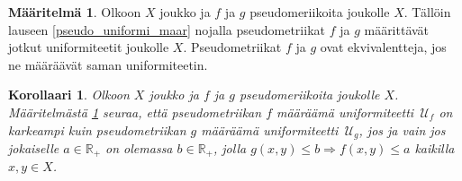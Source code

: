 \documentclass[12pt,a4paper,leqno]{report}
\newcommand{\R}{\mathbb{R}}
\newcommand{\U}{\,\mathcal{U}}
\theoremstyle{plain}
\newtheorem{kor}[equation]{Korollaari}
\theoremstyle{definition}
\newtheorem{maar}[equation]{Määritelmä}
\theoremstyle{remark}
\begin{document}
\begin{maar}\label{pseudo_equiv}
Olkoon $X$ joukko ja $f$ ja $g$ pseudomeriikoita joukolle $X$. 
Tällöin lauseen \ref{pseudo_uniformi_maar} nojalla 
pseudometriikat $f$ ja $g$ määrittävät jotkut uniformiteetit joukolle $X$.
Pseudometriikat $f$ ja $g$ ovat ekvivalentteja, jos ne määräävät saman uniformiteetin.
\end{maar}
\begin{kor}
Olkoon $X$ joukko ja $f$ ja $g$ pseudomeriikoita joukolle $X$. 
Määritelmästä \ref{pseudo_equiv} seuraa, että pseudometriikan $f$ määräämä uniformiteetti 
$\U_f$ 
on karkeampi kuin pseudometriikan $g$ määräämä uniformiteetti $\U_g$, jos ja vain jos jokaiselle 
$a\in\R_+$ on olemassa $b\in\R_+$, jolla $g(x,y)\leq b \Rightarrow f(x,y)\leq a$ kaikilla $x,y\in X$.
 

\end{kor}
\end{document}
